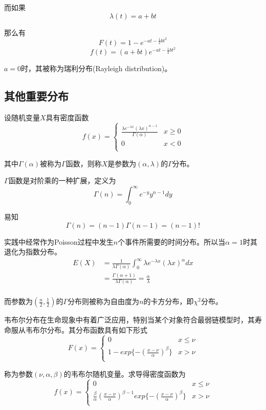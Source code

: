\documentclass[UTF8]{ctexart}
\begin{document}
而如果
$$\lambda (t)=a+bt $$

那么有
$$F(t)=1-e^{-at-\frac{1}{2}bt^{2}} $$
$$f(t)=(a+bt)e^{-at-\frac{1}{2}bt^{2}} $$

$a=0$时，其被称为瑞利分布(Rayleigh distribution)。

\subsection{其他重要分布}

设随机变量$X$具有密度函数
$$f(x)=\left\{
\begin{array}{ll}
\displaystyle\frac{\lambda e^{-\lambda x}(\lambda x)^{\alpha -1}}{\Gamma (\alpha )} & x\geq 0\\
0 &x<0\\
\end{array}
\right. $$

其中$\Gamma (\alpha)$被称为$\Gamma $函数，则称$X$是参数为$(\alpha ,\lambda )$的$\Gamma $分布。

$\Gamma $函数是对阶乘的一种扩展，定义为
$$\Gamma (n)=\int_{0}^{\infty }e^{-y}y^{n-1}dy $$

易知
$$\Gamma (n)=(n-1)\Gamma (n-1) =(n-1)!$$

实践中经常作为Poisson过程中发生$n$个事件所需要的时间分布。所以当$\alpha =1$时其退化为指数分布。
$$\begin{aligned}
E(X)&=\frac{1}{\lambda \Gamma (\alpha )}\int_{0}^{\infty }\lambda e^{-\lambda x}(\lambda x)^{\alpha }dx\\
&=\displaystyle\frac{\Gamma (\alpha +1)}{\lambda \Gamma (\alpha )}=\frac{\alpha }{\lambda }\\
\end{aligned} $$

而参数为$(\frac{n}{2},\frac{1}{2})$的$\Gamma $分布则被称为自由度为$n$的卡方分布，即$\chi^{2}$分布。

韦布尔分布在生命现象中有着广泛应用，特别当某个对象符合最弱链模型时，其寿命服从韦布尔分布。其分布函数具有如下形式
$$F(x)=\left\{
\begin{array}{ll}
0 &x\leq \nu \\
1-exp\{-(\displaystyle\frac{x-\nu }{\alpha })^{\beta }\} &x>\nu \\
\end{array}
\right. $$

称为参数$(\nu ,\alpha ,\beta )$的韦布尔随机变量。求导得密度函数为
$$f(x)=\left\{
\begin{array}{ll}
0 &x\leq \nu \\
\displaystyle\frac{\beta }{\alpha }(\frac{x-\nu }{\alpha })^{\beta -1} exp\{-(\frac{x-\nu }{\alpha })^{\beta }\} &x>\nu \\
\end{array}
\right. $$
\end{document}
